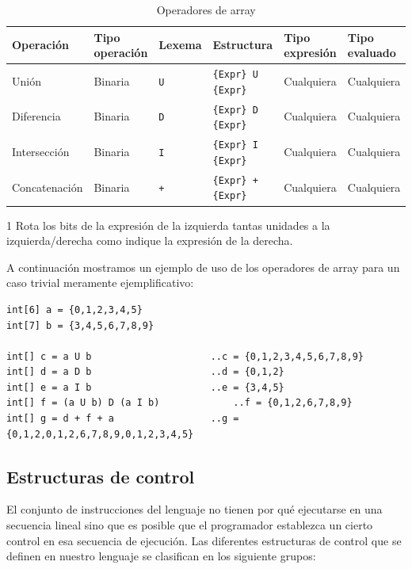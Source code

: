 \documentclass[11pt, english]{article}
\begin{document}
\begin{table}[H]
	\begin{center}
		\caption{Operadores de array}\label{tab:array-op}
		\begin{threeparttable}
			\begin{tabular}{l|l|l|l|l|l}
				\toprule
				\textbf{Operación} & \textbf{Tipo operación} & \textbf{Lexema} & \textbf{Estructura} & \textbf{Tipo expresión} & \textbf{Tipo evaluado}\\
				\midrule
				Unión & Binaria & \texttt{U} & \texttt{\{Expr\} U \{Expr\}} & Cualquiera & Cualquiera\\
				Diferencia & Binaria & \texttt{D} & \texttt{\{Expr\} D \{Expr\}} & Cualquiera & Cualquiera\\
				Intersección & Binaria & \texttt{I} & \texttt{\{Expr\} I \{Expr\}} & Cualquiera & Cualquiera\\
				Concatenación & Binaria & \texttt{+} & \texttt{\{Expr\} + \{Expr\}} & Cualquiera & Cualquiera\\
				\bottomrule
			\end{tabular}
			\begin{tablenotes}
				\small
				\item[1] Rota los bits de la expresión de la izquierda tantas unidades a la izquierda/derecha como indique la expresión de la derecha.
			\end{tablenotes}
		\end{threeparttable}
	\end{center}
\end{table}

A continuación mostramos un ejemplo de uso de los operadores de array para un caso trivial meramente ejemplificativo:
\begin{lstlisting}[caption=Ejemplo de uso de operadores de array]
int[6] a = {0,1,2,3,4,5}
int[7] b = {3,4,5,6,7,8,9}

int[] c = a U b 					..c = {0,1,2,3,4,5,6,7,8,9}
int[] d = a D b 					..d = {0,1,2}
int[] e = a I b 					..e = {3,4,5}
int[] f = (a U b) D (a I b) 			..f = {0,1,2,6,7,8,9}
int[] g = d + f + a 				..g = {0,1,2,0,1,2,6,7,8,9,0,1,2,3,4,5}
\end{lstlisting}

\subsection{Estructuras de control}
El conjunto de instrucciones del lenguaje no tienen por qué ejecutarse en una secuencia lineal sino que es posible que el programador establezca un cierto control en esa secuencia de ejecución. Las diferentes estructuras de control que se definen en nuestro lenguaje se clasifican en los siguiente grupos:
\end{document}
